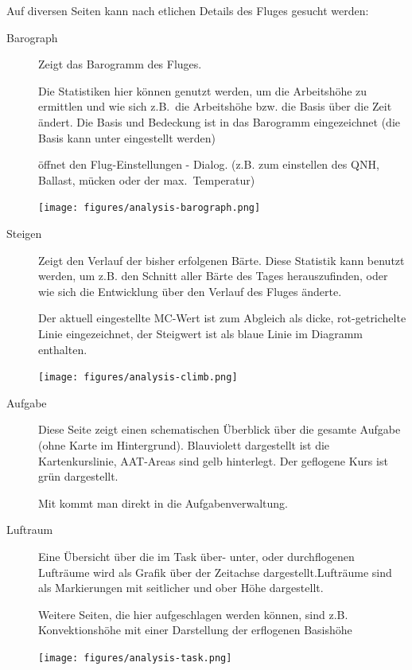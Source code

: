 Auf diversen Seiten kann nach etlichen Details  des Fluges gesucht werden:
\begin{description}
\item[Barograph]  Zeigt das Barogramm des Fluges.

Die Statistiken hier können genutzt werden, um die Arbeitshöhe zu ermittlen und wie sich z.B.\  die Arbeitshöhe bzw. die Basis über die Zeit ändert. Die Basis und Bedeckung ist in das Barogramm eingezeichnet (die Basis kann unter   eingestellt werden)

  öffnet den Flug-Einstellungen - Dialog.
  (z.B. zum einstellen des QNH, Ballast, mücken oder der max.\ Temperatur)

\begin{center}
\texttt{[image: figures/analysis-barograph.png]}
\end{center}

\item[Steigen]
  Zeigt den Verlauf der bisher erfolgenen Bärte.
  Diese Statistik kann benutzt werden, um z.B. den Schnitt aller Bärte des Tages herauszufinden, oder wie sich die Entwicklung über den Verlauf des Fluges änderte.

  Der aktuell eingestellte MC-Wert  ist zum Abgleich als dicke, rot-getrichelte Linie eingezeichnet, der Steigwert ist als blaue Linie im Diagramm enthalten.


\begin{center}
\texttt{[image: figures/analysis-climb.png]}
\end{center}

\item[Aufgabe]
Diese Seite zeigt einen schematischen Überblick über die gesamte Aufgabe (ohne Karte im Hintergrund).
Blauviolett dargestellt ist die Kartenkurslinie, AAT-Areas sind gelb hinterlegt. Der geflogene Kurs ist grün dargestellt.

Mit  kommt man direkt in die Aufgabenverwaltung.

\item[Luftraum]
Eine Übersicht über die im Task über- unter, oder durchflogenen Lufträume wird als Grafik über der Zeitachse dargestellt.Lufträume sind als Markierungen mit seitlicher und ober Höhe  dargestellt.

Weitere Seiten, die hier aufgeschlagen werden können,  sind z.B. Konvektionshöhe mit einer Darstellung der erflogenen Basishöhe

\begin{center}
\texttt{[image: figures/analysis-task.png]}
\end{center}
\end{description}

